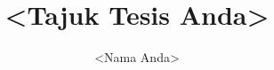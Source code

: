 \documentclass[bahasam,nohyphen]{GayaUKM}
\title{<Tajuk Tesis Anda>}
\author{<Nama Anda>}
\begin{document}
\maketitle

\frontmatter
\declaration








\tableofcontents\clearpage
\listoffigures\clearpage
\listoftables\clearpage




\mainmatter







\appendix


\end{document}
